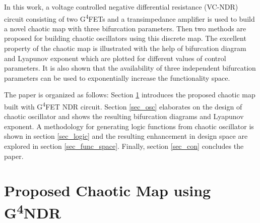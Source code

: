 \documentclass[conference]{IEEEtran}
\begin{document}
In this work, a voltage controlled negative differential resistance (VC-NDR) circuit consisting of two G\textsuperscript4FETs and a transimpedance amplifier is used to build a novel chaotic map with three bifurcation parameters. %
Then two methods are proposed for building chaotic oscillators using this discrete map. The excellent property of the chaotic map is illustrated with the help of bifurcation diagram and Lyapunov exponent which are plotted for different values of control parameters. It is also shown that the availability of three independent bifurcation parameters can be used to exponentially increase the functionality space.



The paper is organized as follows: Section \ref{sec_map} introduces the proposed chaotic map built with G\textsuperscript4FET  NDR circuit. Section \ref{sec_osc} elaborates on the design of chaotic oscillator and shows the resulting bifurcation diagrams and  Lyapunov exponent. A methodology for generating logic functions from chaotic oscillator is shown in section \ref{sec_logic} and the resulting enhancement in design space are explored in section \ref{sec_func_space}.
Finally, section \ref{sec_con} concludes the paper.


\section{Proposed Chaotic Map using G\textsuperscript4NDR}
\label{sec_map}
\end{document}
